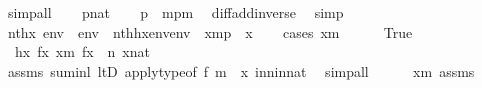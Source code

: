 \begin{isabellebody}
\ simp{\isacharunderscore}{\kern0pt}all\isanewline
\ \ \isamarkupfalse%
\ {\isacartoucheopen}p{\isasymin}nat{\isacartoucheclose}\isanewline
\ \ \isamarkupfalse%
\ {\isachardoublequoteopen}p\ {\isacharequal}{\kern0pt}\ {\isacharparenleft}{\kern0pt}m{\isacharhash}{\kern0pt}{\isacharplus}{\kern0pt}p{\isacharparenright}{\kern0pt}{\isacharhash}{\kern0pt}{\isacharminus}{\kern0pt}m{\isachardoublequoteclose}\ \isamarkupfalse%
\ diff{\isacharunderscore}{\kern0pt}add{\isacharunderscore}{\kern0pt}inverse{}\ \isamarkupfalse%
\ simp\isanewline
\ \ \isamarkupfalse%
\ {\isachardoublequoteopen}nth{\isacharparenleft}{\kern0pt}x{\isacharcomma}{\kern0pt}\ env\ {\isacharat}{\kern0pt}\ env{}{\isacharparenright}{\kern0pt}\ {\isacharequal}{\kern0pt}\ nth{\isacharparenleft}{\kern0pt}{\isacharquery}{\kern0pt}h{\isacharbackquote}{\kern0pt}x{\isacharcomma}{\kern0pt}env{\isacharprime}{\kern0pt}{\isacharat}{\kern0pt}env{}{\isacharparenright}{\kern0pt}{\isachardoublequoteclose}\ \ {\isachardoublequoteopen}x{\isacharless}{\kern0pt}m{\isacharhash}{\kern0pt}{\isacharplus}{\kern0pt}p{\isachardoublequoteclose}\ \ x\isanewline
\ \ \isamarkupfalse%
\ {\isacharparenleft}{\kern0pt}cases\ {\isachardoublequoteopen}x{\isacharless}{\kern0pt}m{\isachardoublequoteclose}{\isacharparenright}{\kern0pt}\isanewline
\ \ \ \ \isamarkupfalse%
\ True\isanewline
\ \ \ \ \isamarkupfalse%
\isanewline
\ \ \ \ \isamarkupfalse%
\ {}{\isacharcolon}{\kern0pt}\ {\isachardoublequoteopen}{\isacharquery}{\kern0pt}h{\isacharbackquote}{\kern0pt}x{\isacharequal}{\kern0pt}\ f{\isacharbackquote}{\kern0pt}x{\isachardoublequoteclose}\ {\isachardoublequoteopen}x{\isasymin}m{\isachardoublequoteclose}\ {\isachardoublequoteopen}f{\isacharbackquote}{\kern0pt}x\ {\isasymin}\ n{\isachardoublequoteclose}\ {\isachardoublequoteopen}x{\isasymin}nat{\isachardoublequoteclose}\isanewline
\ \ \ \ \ \ \isamarkupfalse%
\ assms\ sum{\isacharunderscore}{\kern0pt}inl\ ltD\ apply{\isacharunderscore}{\kern0pt}type{\isacharbrackleft}{\kern0pt}of\ f\ m\ {\isacharunderscore}{\kern0pt}\ x{\isacharbrackright}{\kern0pt}\ in{\isacharunderscore}{\kern0pt}n{\isacharunderscore}{\kern0pt}in{\isacharunderscore}{\kern0pt}nat\ \isamarkupfalse%
\ simp{\isacharunderscore}{\kern0pt}all\isanewline
\ \ \ \ \isamarkupfalse%
\ {\isacartoucheopen}x{\isacharless}{\kern0pt}m{\isacartoucheclose}\ assms\isanewline

\end{isabellebody}
